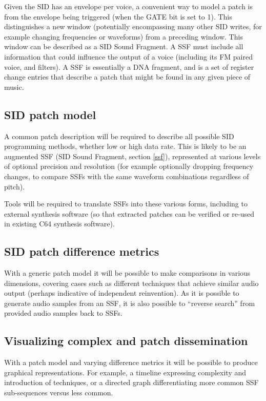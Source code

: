 \documentclass[10pt]{article}
\begin{document}
\begin{multicols*}{2}
Given the SID has an envelope per voice, a convenient way to model a patch is from the envelope being triggered (when the GATE bit is set to 1). This distinguishes a new window (potentially encompassing many other SID writes, for example changing frequencies or waveforms) from a preceding window. This window can be described as a SID Sound Fragment. A SSF must include all information that could influence the output of a voice (including its FM paired voice, and filters). A SSF is essentially a DNA fragment, and is a set of register change entries that describe a patch that might be found in any given piece of music.

\subsection{SID patch model}

A common patch description will be required to describe all possible SID programming methods, whether low or high data rate. This is likely to be an augmented SSF (SID Sound Fragment, section \ref{ssf}), represented at various levels of optional precision and resolution (for example optionally dropping frequency changes, to compare SSFs with the same waveform combinations regardless of pitch).

Tools will be required to translate SSFs into these various forms, including to external synthesis software (so that extracted patches can be verified or re-used in existing C64 synthesis software).

\subsection{SID patch difference metrics}

With a generic patch model it will be possible to make comparisons in various dimensions, covering cases such as different techniques that achieve similar audio output (perhaps indicative of independent reinvention). As it is possible to generate audio samples from an SSF, it is also possible to “reverse search” from provided audio samples back to SSFs.

\subsection{Visualizing complex and patch dissemination}

With a patch model and varying difference metrics it will be possible to produce graphical representations. For example, a timeline expressing complexity and introduction of techniques, or a directed graph differentiating more common SSF sub-sequences versus less common.


\end{multicols*}
\end{document}
